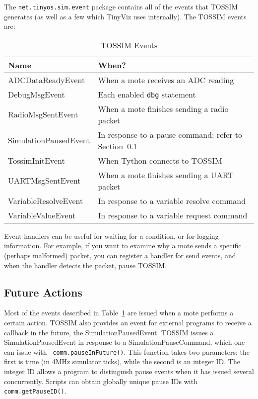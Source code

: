 \documentclass[10pt]{article}
\newcommand{\name}{{Tython}\xspace}
\begin{document}
The {\tt net.tinyos.sim.event} package contains all of the events that
TOSSIM generates (as well as a few which TinyViz uses internally). The
TOSSIM events are:

\begin{table}
\centering
\begin{tabular} {|l|l|} \hline
Name                    & When? \\ \hline
ADCDataReadyEvent       & When a mote receives an ADC reading\\
DebugMsgEvent           & Each enabled {\tt dbg} statement\\
RadioMsgSentEvent       & When a mote finishes sending a radio packet\\
SimulationPausedEvent   & In response to a pause command; refer to Section~\ref{sec:pausing} \\
TossimInitEvent         & When \name connects to TOSSIM \\
UARTMsgSentEvent        & When a mote finishes sending a UART packet \\
VariableResolveEvent    & In response to a variable resolve command \\
VariableValueEvent      & In response to a variable request command \\ \hline 
\end{tabular}
\caption{TOSSIM Events}
\label{table:events}
\end{table}

Event handlers can be useful for waiting for a condition, or for
logging information. For example, if you want to examine why a mote
sends a specific (perhaps malformed) packet, you can register a
handler for send events, and when the handler detects the packet,
pause TOSSIM.

\subsection{Future Actions}
\label{sec:pausing}

Most of the events described in Table~\ref{table:events} are issued
when a mote performs a certain action. TOSSIM also provides an event
for external programs to receive a callback in the future, the
SimulationPausedEvent. TOSSIM issues a SimulationPausedEvent in
response to a SimulationPauseCommand, which one can issue with {\tt
comm.pauseInFuture()}. This function takes two parameters; the first
is time (in 4MHz simulator ticks), while the second is an integer ID.
The integer ID allows a program to distinguish pause events when it
has issued several concurrently. Scripts can obtain globally unique
pause IDs with {\tt comm.getPauseID()}.
\end{document}
